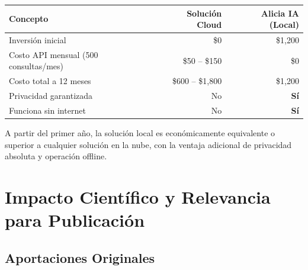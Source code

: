 \documentclass[12pt,a4paper]{article}
\begin{document}
\begin{infobox}
  \begin{tabular}{lrr}
    \textbf{Concepto} & \textbf{Solución Cloud} & \textbf{Alicia IA (Local)} \\
    \hline
    Inversión inicial & \$0 & \$1,200 \\
    Costo API mensual (500 consultas/mes) & \$50 -- \$150 & \$0 \\
    Costo total a 12 meses & \$600 -- \$1,800 & \$1,200 \\
    Privacidad garantizada & No & \textbf{Sí} \\
    Funciona sin internet & No & \textbf{Sí} \\
  \end{tabular}

  \medskip
  A partir del primer año, la solución local es económicamente equivalente o superior a cualquier
  solución en la nube, con la ventaja adicional de privacidad absoluta y operación offline.
\end{infobox}

\newpage

\section{Impacto Científico y Relevancia para Publicación}

\subsection{Aportaciones Originales}
\end{document}
